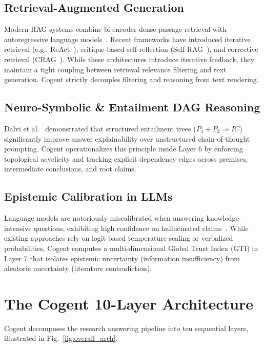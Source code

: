 \documentclass[journal,compsoc]{IEEEtran}
\begin{document}
\subsection{Retrieval-Augmented Generation}
Modern RAG systems combine bi-encoder dense passage retrieval with autoregressive language models~\cite{lewis2020rag,karpukhin2020dpr}. Recent frameworks have introduced iterative retrieval (e.g., ReAct~\cite{yao2023react}), critique-based self-reflection (Self-RAG~\cite{asai2024selfrag}), and corrective retrieval (CRAG~\cite{yan2024crag}). While these architectures introduce iterative feedback, they maintain a tight coupling between retrieval relevance filtering and text generation. Cogent strictly decouples filtering and reasoning from text rendering.

\subsection{Neuro-Symbolic \& Entailment DAG Reasoning}
Dalvi et al.~\cite{dalvi2021explaining} demonstrated that structured entailment trees ($P_1 + P_2 \Rightarrow IC$) significantly improve answer explainability over unstructured chain-of-thought prompting. Cogent operationalizes this principle inside Layer 6 by enforcing topological acyclicity and tracking explicit dependency edges across premises, intermediate conclusions, and root claims.

\subsection{Epistemic Calibration in LLMs}
Language models are notoriously miscalibrated when answering knowledge-intensive questions, exhibiting high confidence on hallucinated claims~\cite{guo2017calibration,min2023factscore,ni2026trustworthy}. While existing approaches rely on logit-based temperature scaling or verbalized probabilities, Cogent computes a multi-dimensional Global Trust Index (GTI) in Layer 7 that isolates epistemic uncertainty (information insufficiency) from aleatoric uncertainty (literature contradiction).

\section{The Cogent 10-Layer Architecture}
\label{sec:architecture}

Cogent decomposes the research answering pipeline into ten sequential layers, illustrated in Fig.~\ref{fig:overall_arch}.
\end{document}
